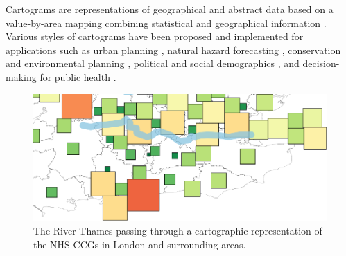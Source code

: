 \documentclass[Afour,sagev,times]{sagej}
\begin{document}
\begin{samepage}

    Cartograms are representations of geographical and abstract data based on a value-by-area mapping combining statistical and geographical information \cite{dent2009Cartography,inoue2011New}.
    Various styles of cartograms have been proposed and implemented for applications such as urban planning \cite{harris2018Mapping, arranz-lopez2021Enduser}, natural hazard forecasting \cite{pappenberger2019Cartograms, park2020Flood}, conservation and environmental planning \cite{galluzzi2018Mapping, rocchini2019Cartogramming}, political and social demographics \cite{breitzman2018Using, alieva2021How}, and decision-making for public health \cite{gao2020Visualising, sack2021Visualizing}.

    \begin{figure}[b!]
        \centering
        \includegraphics[width=\linewidth,keepaspectratio]{cover.png}
        \caption{The River Thames passing through a cartographic representation of the NHS CCGs in London and surrounding areas.}
        \label{fig:cover}
    \end{figure}

\end{samepage}
\end{document}
